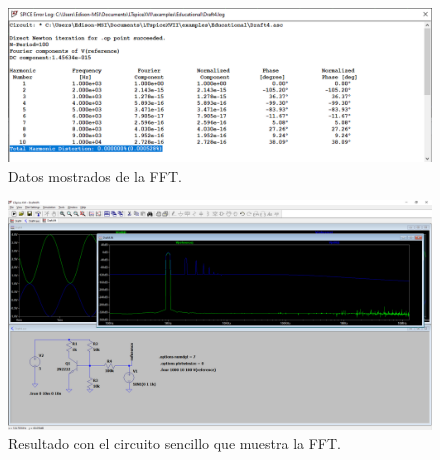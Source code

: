 \documentclass[a4paper]{article} %
\begin{document}
\begin{figure} %
	\centering %
	\includegraphics[scale=0.4]{IMAGENES/img23} %
	\caption{Datos mostrados de la FFT.} %
	\label{img23} %
\end{figure} %

\begin{figure} %
	\centering %
	\includegraphics[scale=0.3]{IMAGENES/img24} %
	\caption{Resultado con el circuito sencillo que muestra la FFT.} %
	\label{img24} %
\end{figure} %
\end{document}
